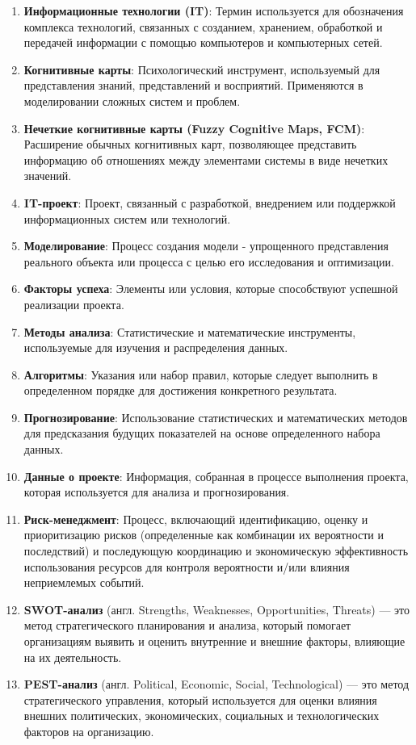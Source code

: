 \documentclass{article}
\begin{document}
    \begin{enumerate}
        \item \textbf{Информационные технологии (IT)}: Термин используется для обозначения комплекса технологий, связанных с созданием, хранением, обработкой и передачей информации с помощью компьютеров и компьютерных сетей.
        \item \textbf{Когнитивные карты}: Психологический инструмент, используемый для представления знаний, представлений и восприятий. Применяются в моделировании сложных систем и проблем.
        \item \textbf{Нечеткие когнитивные карты (Fuzzy Cognitive Maps, FCM)}: Расширение обычных когнитивных карт, позволяющее представить информацию об отношениях между элементами системы в виде нечетких значений.
        \item \textbf{IT-проект}: Проект, связанный с разработкой, внедрением или поддержкой информационных систем или технологий.
        \item \textbf{Моделирование}: Процесс создания модели - упрощенного представления реального объекта или процесса с целью его исследования и оптимизации.
        \item \textbf{Факторы успеха}: Элементы или условия, которые способствуют успешной реализации проекта.
        \item \textbf{Методы анализа}: Статистические и математические инструменты, используемые для изучения и распределения данных.
        \item \textbf{Алгоритмы}: Указания или набор правил, которые следует выполнить в определенном порядке для достижения конкретного результата.
        \item \textbf{Прогнозирование}: Использование статистических и математических методов для предсказания будущих показателей на основе определенного набора данных.
        \item \textbf{Данные о проекте}: Информация, собранная в процессе выполнения проекта, которая используется для анализа и прогнозирования.
        \item \textbf{Риск-менеджмент}: Процесс, включающий идентификацию, оценку и приоритизацию рисков (определенные как комбинации их вероятности и последствий) и последующую координацию и экономическую эффективность использования ресурсов для контроля вероятности и/или влияния неприемлемых событий.
        \item \textbf{SWOT-анализ} (англ. Strengths, Weaknesses, Opportunities, Threats) — это метод стратегического планирования и анализа, который помогает организациям выявить и оценить внутренние и внешние факторы, влияющие на их деятельность.
        \item \textbf{PEST-анализ} (англ. Political, Economic, Social, Technological) — это метод стратегического управления, который используется для оценки влияния внешних политических, экономических, социальных и технологических факторов на организацию.
    \end{enumerate}
\end{document}
